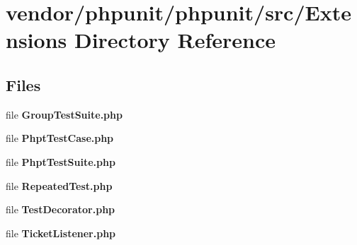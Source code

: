 \section{vendor/phpunit/phpunit/src/\+Extensions Directory Reference}
\label{dir_ca1aa5bc6dd2835a22e02b7089102c96}
\subsection*{Files}
\begin{DoxyCompactItemize}
\item 
file {\bf Group\+Test\+Suite.\+php}
\item 
file {\bf Phpt\+Test\+Case.\+php}
\item 
file {\bf Phpt\+Test\+Suite.\+php}
\item 
file {\bf Repeated\+Test.\+php}
\item 
file {\bf Test\+Decorator.\+php}
\item 
file {\bf Ticket\+Listener.\+php}
\end{DoxyCompactItemize}
